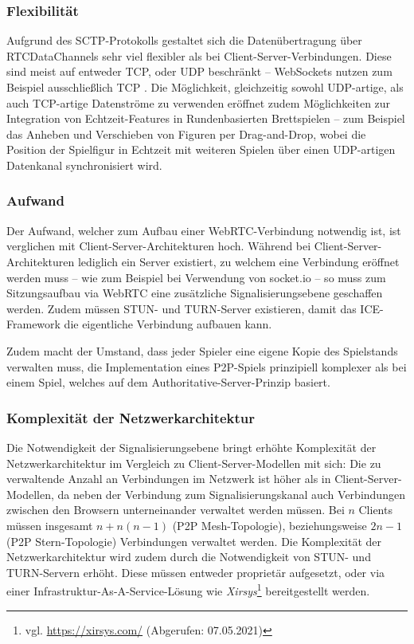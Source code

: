 \subsubsection{Flexibilität}
Aufgrund des \acs{SCTP}-Protokolls gestaltet sich die Datenübertragung über RTCDataChannels sehr viel flexibler als bei Client-Server-Verbindungen. Diese sind meist auf entweder \acs{TCP}, oder \acs{UDP} beschränkt -- WebSockets nutzen zum Beispiel ausschließlich \acs{TCP} \cite{websocketRFC}. Die Möglichkeit, gleichzeitig sowohl UDP-artige, als auch TCP-artige Datenströme zu verwenden eröffnet zudem Möglichkeiten zur Integration von Echtzeit-Features in Rundenbasierten Brettspielen -- zum Beispiel das Anheben und Verschieben von Figuren per Drag-and-Drop, wobei die Position der Spielfigur in Echtzeit mit weiteren Spielen über einen UDP-artigen Datenkanal synchronisiert wird.

\subsubsection{Aufwand}
Der Aufwand, welcher zum Aufbau einer WebRTC-Verbindung notwendig ist, ist verglichen mit Client-Server-Architekturen hoch. Während bei Client-Server-Architekturen lediglich ein Server existiert, zu welchem eine Verbindung eröffnet werden muss -- wie zum Beispiel bei Verwendung von socket.io -- so muss zum Sitzungsaufbau via WebRTC eine zusätzliche Signalisierungsebene geschaffen werden. Zudem müssen STUN- und TURN-Server existieren, damit das \acs{ICE}-Framework die eigentliche Verbindung aufbauen kann.\par

Zudem macht der Umstand, dass jeder Spieler eine eigene Kopie des Spielstands verwalten muss, die Implementation eines \acs{P2P}-Spiels prinzipiell komplexer als bei einem Spiel, welches auf dem Authoritative-Server-Prinzip basiert.

\subsubsection{Komplexität der Netzwerkarchitektur}
Die Notwendigkeit der Signalisierungsebene bringt erhöhte Komplexität der Netzwerkarchitektur im Vergleich zu Client-Server-Modellen mit sich: Die zu verwaltende Anzahl an Verbindungen im Netzwerk ist höher als in Client-Server-Modellen, da neben der Verbindung zum Signalisierungskanal auch Verbindungen zwischen den Browsern unterneinander verwaltet werden müssen. Bei $n$ Clients müssen insgesamt $n + n(n-1)$ (P2P Mesh-Topologie), beziehungsweise $2n - 1$ (P2P Stern-Topologie) Verbindungen verwaltet werden. Die Komplexität der Netzwerkarchitektur wird zudem durch die Notwendigkeit von \acs{STUN}- und \acs{TURN}-Servern erhöht. Diese müssen entweder proprietär aufgesetzt, oder via einer Infrastruktur-As-A-Service-Lösung wie \textit{Xirsys}\footnote{vgl. \url{https://xirsys.com/} (Abgerufen: 07.05.2021)} bereitgestellt werden.

